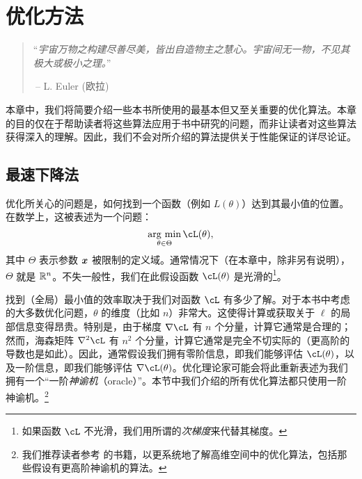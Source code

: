 \documentclass[../../book-main.tex]{subfiles}
\begin{document}
\chapter{优化方法}
\label{app:optimization}

\begin{quote}
“{\em 宇宙万物之构建尽善尽美，皆出自造物主之慧心。宇宙间无一物，不见其极大或极小之理。}”

$~$\hfill -- L. Euler (欧拉)
 \end{quote}
\vspace{5mm}

本章中，我们将简要介绍一些本书所使用的最基本但又至关重要的优化算法。本章的目的仅在于帮助读者将这些算法应用于书中研究的问题，而非让读者对这些算法获得深入的理解。因此，我们不会对所介绍的算法提供关于性能保证的详尽论证。

\section{最速下降法}


优化所关心的问题是，如何找到一个函数（例如 \(L(\theta)\)）达到其最小值的位置。在数学上，这被表述为一个问题：
\begin{equation}
    \argmin_{\theta \in \Theta} \cL(\theta),
\end{equation}
其中 \(\Theta\) 表示参数 \(\bm{x}\) 被限制的定义域。通常情况下（在本章中，除非另有说明），\(\Theta\) 就是 \(\mathbb{R}^n\)。不失一般性，我们在此假设函数 \(\cL(\theta)\) 是光滑的\footnote{如果函数 \(\cL\) 不光滑，我们用所谓的\textit{次梯度}来代替其梯度。}。

找到（全局）最小值的效率取决于我们对函数 \(\cL\) 有多少了解。对于本书中考虑的大多数优化问题，\(\theta\) 的维度（比如 \(n\)）非常大。这使得计算或获取关于 \(\ell\) 的局部信息变得昂贵。特别是，由于梯度 \(\nabla \cL\) 有 \(n\) 个分量，计算它通常是合理的；然而，海森矩阵 \(\nabla^{2} \cL\) 有 \(n^{2}\) 个分量，计算它通常是完全不切实际的（更高阶的导数也是如此）。因此，通常假设我们拥有零阶信息，即我们能够评估 \(\cL(\theta)\)，以及一阶信息，即我们能够评估 \(\nabla \cL(\theta)\)。优化理论家可能会将此重新表述为我们拥有一个“一阶\textit{神谕机}（oracle）”。本节中我们介绍的所有优化算法都只使用一阶神谕机。\footnote{我们推荐读者参考 \cite{Wright-Ma-2022} 的书籍，以更系统地了解高维空间中的优化算法，包括那些假设有更高阶神谕机的算法。}
\end{document}
